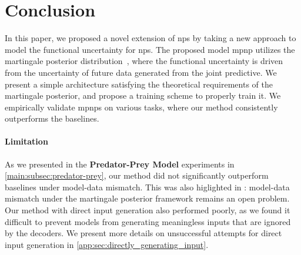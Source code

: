 \section{Conclusion}
\label{main:sec:conclusion}
In this paper, we proposed a novel extension of \glspl{np} by taking a new approach to model the functional uncertainty for \glspl{np}.
The proposed model \gls{mpnp} utilizes the martingale posterior distribution~\citep{fong2021martingale}, 
where the functional uncertainty is driven from the uncertainty of future data generated from the joint predictive.
We present a simple architecture satisfying the theoretical requirements of the martingale posterior, and propose a training scheme to properly train it. We empirically validate \glspl{mpnp} on various tasks, where our method consistently outperforms the baselines.

\paragraph{Limitation}
As we presented in the \textbf{Predator-Prey Model} experiments in \cref{main:subsec:predator-prey}, 
our method did not significantly outperform baselines under model-data mismatch. This was also higlighted in \citet{fong2021martingale}: model-data mismatch under the martingale posterior framework remains an open problem.
Our method with direct input generation also performed poorly, as we found it difficult to prevent models from generating meaningless inputs that are ignored by the decoders. We present more details on unsuccessful attempts for direct input generation in \cref{app:sec:directly_generating_input}.

